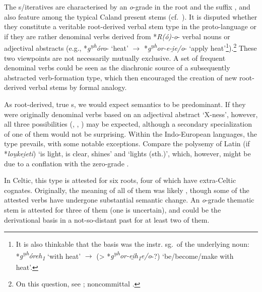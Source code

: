 \documentclass[output=paper,colorlinks,citecolor=brown]{langscibook}
\begin{document}
The s/iteratives are characterised by an \textit{o}-grade in the root and the suffix , and also feature among the typical Caland present stems  (cf.\ \citealt[141--143]{Rau2009}). It is disputed whether they constitute a veritable root-derived verbal stem type in the proto-language or if they are rather denominal verbs derived from *\textit{R(ó)-o}- verbal nouns or adjectival abstracts (e.g., *\textit{g\textsuperscript{u̯h}óro}-  ‘heat’ $\rightarrow$  *\textit{g\textsuperscript{u̯h}or-e-i̯e/o}- ‘apply heat’\footnote{It is also thinkable that the basis was the instr. sg.\ of the underlying noun: *\textit{g\textsuperscript{u̯h}óreh\textsubscript{1}} ‘with heat’ $\rightarrow$  (> *\textit{g\textsuperscript{u̯h}or-ei̯h\textsubscript{1}e/o}-?) ‘be/become/make with heat’.}).\footnote{On this question, see \citet{Peters2016}; noncommittal \citet{Bozzone2020}.} These two viewpoints are not necessarily mutually exclusive. A set of frequent denominal verbs could be seen as the diachronic source of a subsequently abstracted verb-formation type, which then encouraged the creation of new root-derived verbal stems by formal analogy.

As root-derived, true s, we would expect  semantics to be predominant. If they were originally denominal verbs based on an adjectival abstract  ‘X-ness’, however, all three possibilities (, , ) may be expected, although a secondary specialization of one of them would not be surprising. Within the Indo-European languages, the  type prevails, with some notable exceptions. Compare the polysemy of Latin  (if *\textit{lou̯kei̯eti}) ‘is light, is clear, shines’ and ‘lights (sth.)’, which, however, might be due to a conflation with the zero-grade .

In Celtic, this type is attested for six roots, four of which have extra-Celtic cognates. Originally, the meaning of all of them was likely , though some of the attested verbs have undergone substantial semantic change. An \textit{o}-grade thematic stem is attested for three of them (one is uncertain), and could be the derivational basis in a not-so-distant past for at least two of them.
\end{document}
